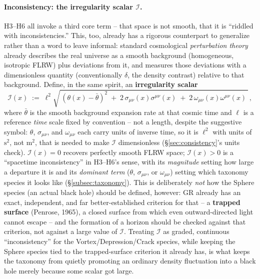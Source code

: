 \documentclass[12pt, a4paper]{article}
\begin{document}
\paragraph{Inconsistency: the irregularity scalar $\mathcal{I}$.}
H3--H6 all invoke a third core term -- that space is not smooth, that
it is ``riddled with inconsistencies.'' This, too, already has a
rigorous counterpart to generalize rather than a word to leave
informal: standard cosmological \emph{perturbation theory} already
describes the real universe as a smooth background (homogeneous,
isotropic FLRW) plus deviations from it, and measures those
deviations with a dimensionless quantity (conventionally $\delta$,
the density contrast) relative to that background. Define, in the
same spirit, an \textbf{irregularity scalar}
\begin{equation}
\mathcal{I}(x) \;:=\; \ell^2\sqrt{\,(\theta(x)-\bar\theta)^2 \;+\;
2\,\sigma_{\mu\nu}(x)\sigma^{\mu\nu}(x) \;+\; 2\,\omega_{\mu\nu}(x)
\omega^{\mu\nu}(x)\,}\,,
\end{equation}
where $\bar\theta$ is the smooth background expansion rate at that
cosmic time and $\ell$ is a reference \emph{time} scale fixed by
convention -- not a length, despite the suggestive symbol: $\theta$,
$\sigma_{\mu\nu}$, and $\omega_{\mu\nu}$ each carry units of inverse
time, so it is $\ell^2$ with units of $\mathrm{s^2}$, not
$\mathrm{m^2}$, that is needed to make $\mathcal{I}$ dimensionless
(\S\ref{sec:consistency}'s units check). $\mathcal{I}(x)=0$
recovers perfectly smooth FLRW space; $\mathcal{I}(x)>0$ is a
``spacetime inconsistency'' in H3--H6's sense, with its
\emph{magnitude} setting how large a departure it is and its
\emph{dominant term} ($\theta$, $\sigma_{\mu\nu}$, or
$\omega_{\mu\nu}$) setting which taxonomy species it looks like
(\S\ref{subsec:taxonomy}). This is deliberately \emph{not} how the
Sphere species (an actual black hole) should be defined, however: GR
already has an exact, independent, and far better-established
criterion for that -- a \textbf{trapped surface} (Penrose, 1965),
a closed surface from which even outward-directed light cannot
escape -- and the formation of a horizon should be checked against
that criterion, not against a large value of $\mathcal{I}$. Treating
$\mathcal{I}$ as graded, continuous ``inconsistency'' for the
Vortex/Depression/Crack species, while keeping the Sphere species
tied to the trapped-surface criterion it already has, is what keeps
the taxonomy from quietly promoting an ordinary density fluctuation
into a black hole merely because some scalar got large.
\end{document}
